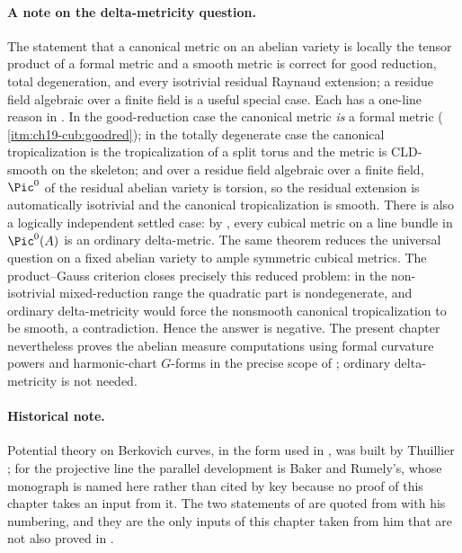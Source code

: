 \paragraph{A note on the delta-metricity question.}
The statement that a canonical metric on an abelian variety is locally the
tensor product of a formal metric and a smooth metric is correct for good
reduction, total degeneration, and every isotrivial residual Raynaud
extension; a residue field algebraic over a finite field is a useful special
case.  Each has a one-line reason in
.  In the good-reduction case the
canonical metric \emph{is} a formal metric
(\,\cref{itm:ch19-cub:goodred}); in the totally
degenerate case the canonical tropicalization is the tropicalization of a
split torus and the metric is CLD-smooth on the skeleton; and over a residue
field algebraic over a finite field, $\Pic^0$ of the residual abelian
variety is torsion, so the residual extension is automatically isotrivial
and the canonical tropicalization is smooth.  There is also a logically
independent settled case: by , every cubical metric
on a line bundle in $\Pic^0(A)$ is an ordinary delta-metric.  The same
theorem reduces the universal question on a fixed abelian variety to ample
symmetric cubical metrics.  The product--Gauss criterion
 closes precisely this reduced
problem: in the non-isotrivial mixed-reduction range the quadratic part is
nondegenerate, and ordinary delta-metricity would force the nonsmooth
canonical tropicalization to be smooth, a contradiction.  Hence the answer
is negative.  The present chapter nevertheless proves the abelian measure computations
using formal curvature powers and harmonic-chart $G$-forms in the precise
scope of ; ordinary delta-metricity is
not needed.

\paragraph{Historical note.}
Potential theory on Berkovich curves, in the form used in
, was built by Thuillier
\cite{Thu05}; for the projective line the parallel development is Baker and
Rumely's, whose monograph is named here rather than cited by key because no
proof of this chapter takes an input from it.  The two statements of
 are quoted from \cite{Thu05} with his
numbering, and they are the only inputs of this chapter taken from him that
are not also proved in .

